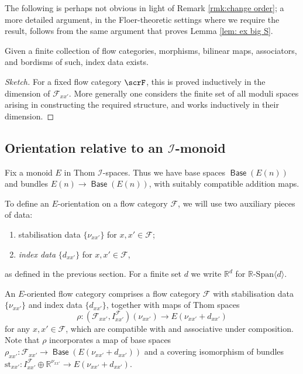\documentclass{TPmod}
\newcommand{\st}{\mathrm{st}}
\def\bR{\mathbb{R}}
\DeclareMathOperator{\Base}{\mathsf{Base}}
\newcommand{\cF}{\mathcal{F}}
\newcommand{\cI}{\mathcal{I}}
\numberwithin{equation}{section}
\begin{document}
The following is perhaps not obvious in light of Remark \ref{rmk:change order}; a more detailed argument, in the Floer-theoretic settings where we require the result, follows from the same argument that proves Lemma \ref{lem: ex big S}.

\begin{lem}
    Given a finite collection of flow categories, morphisms, bilinear maps, associators, and bordisms of such, index data exists.
\end{lem}

\begin{proof}[Sketch]
    For a fixed flow category $\scrF$, this is proved inductively in the dimension of $\cF_{xx'}$. More generally one considers the finite set of all moduli spaces arising in constructing the required structure, and works inductively in their dimension. 
\end{proof}



\subsection{Orientation relative to an $\cI$-monoid}\label{sec: or flow cat I}

Fix a monoid $E$ in Thom $\cI$-spaces. Thus we have base spaces $\Base(E(n))$ and bundles $E(n) \to \Base(E(n))$, with suitably compatible addition maps. 

To define an $E$-orientation on a flow category $\cF$, we will use two auxiliary pieces of data:
\begin{enumerate}
    \item stabilisation data $\{\nu_{xx'}\}$ for $x,x' \in \cF$;
    \item \emph{index data} $\{d_{xx'}\}$ for $x,x' \in \cF$,
\end{enumerate}
as defined in the previous section. For a finite set $d$ we write $\bR^d$ for $\bR$-$\mathrm{Span}\langle d \rangle$.



\begin{defn}\label{defn:E-oriented flow cat}
    An $E$-oriented flow category  comprises a flow category $\cF$ with stabilisation data $\{\nu_{xx'}\}$ and index data $\{d_{xx'}\}$,  together with maps of Thom spaces
   \begin{equation} \label{eqn:structure morphism to E-orient flow category}
   \rho: (\cF_{xx'},I^\cF_{xx'})(\nu_{xx'}) \to E(\nu_{xx'}+d_{xx'})
   \end{equation}
    for any $x,x' \in \cF$, which are compatible with and associative under composition. Note that $\rho$ incorporates a map of base spaces $\rho_{xx'}: \cF_{xx'} \to \Base(E(\nu_{xx'}+ d_{xx'}))$ and a covering isomorphism of bundles $\st_{xx'}: I^{\cF}_{xx'} \oplus \bR^{\nu_{xx'}} \to E(\nu_{xx'} + d_{xx'})$.
\end{defn}
\end{document}
